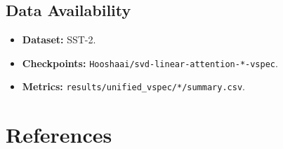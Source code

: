 \subsection{Data Availability}

\begin{itemize}
\item \textbf{Dataset:} SST-2.
\item \textbf{Checkpoints:} \texttt{Hooshaai/svd-linear-attention-*-vspec}.
\item \textbf{Metrics:} \texttt{results/unified\_vspec/*/summary.csv}.

\end{itemize}


\section{References}

